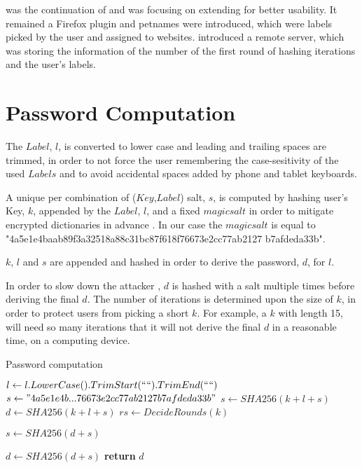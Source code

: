 \documentclass{sig-alternate}
\begin{document}
\passpet \cite{yee2006passpet} was the continuation of \pwdmul and was focusing on
extending \pwdmul for better usability. It remained a Firefox plugin and petnames
were introduced, which were labels picked by the user and assigned to websites. \passpet
introduced a remote server, which was storing the information of the number of
the first round of hashing iterations and the user's labels.

\section{Password Computation}\label{section:computation}

The $Label$, $l$, is converted to lower case and leading and trailing spaces are trimmed, in order to not force the user remembering the case-sesitivity of the used $Labels$ and to avoid accidental spaces added by phone and tablet keyboards.

A unique per combination of ($Key$,$Label$) salt, $s$, is computed by hashing user's
Key, $k$, appended by the $Label$, $l$, and a fixed $magic salt$ in order to
mitigate encrypted dictionaries in advance \cite{morris1979password}. In our case
the $magic salt$ is equal to "4a5e1e4baab89f3a32518a88c31bc87f618f76673e2cc77ab2127
b7afdeda33b".

$k$, $l$ and $s$ are appended and hashed in order to derive the password, $d$, for $l$.

In order to slow down the attacker \cite{kelsey1998secure}, $d$ is hashed with a salt multiple times
before deriving the final $d$. The number of iterations is determined upon the size of $k$,
in order to protect users from picking a short $k$. For example, a $k$ with length 15, will need
so many iterations that it will not derive the final $d$ in a reasonable time, on a computing device.

\begin{algorithm}[H]
  \caption{Password computation}
  \label{onepasswords}
  \begin{algorithmic}[1] %
      \State $l\gets l.LowerCase().TrimStart(`` ``).TrimEnd(`` ``)$
      \State $s\gets "4a5e1e4b...76673e2cc77ab2127b7afdeda33b"$
      \State $s\gets SHA256(k + l + s)$
      \State $d\gets SHA256(k + l + s)$
      \State $rs\gets DecideRounds(k)$

        $s\gets SHA256(d + s)$

        $d\gets SHA256(d + s)$
      \EndFor
      \State \textbf{return} $d$
    \EndProcedure
    \end{algorithmic}
\end{algorithm}
\end{document}
